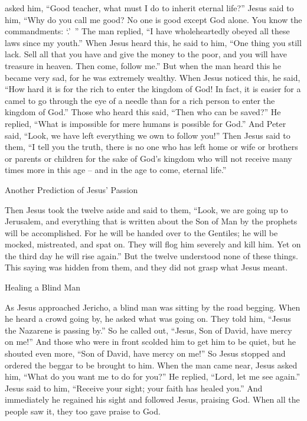 {asked
him,
“Good
teacher,
what
must
I do
to inherit
eternal
life?”
Jesus
said
to him,
“Why
do you call
me
good? No one
is good
except
God
alone.
You know
the commandments: ‘{}.’ ”
The man replied,
“I have wholeheartedly obeyed
all
these
laws since
my youth.”
When
Jesus
heard
this, he said
to him,
“One thing
you
still
lack.
Sell
all
that you have
and
give
the money to the poor,
and
you will have
treasure
in
heaven.
Then
come,
follow
me.”
But
when
the man heard
this
he became
very sad,
for
he was
extremely
wealthy.
When
Jesus
noticed
this,
he said,
“How
hard
it is for the rich
to
enter
the kingdom
of God!
In fact, it is
easier
for
a camel
to go
through
the eye
of a needle
than
for a rich
person to enter
the kingdom
of God.”
Those
who heard
this said,
“Then
who
can
be saved?”
He replied,
“What is impossible
for
mere humans
is
possible
for
God.”
And
Peter
said,
“Look,
we
have left
everything we own
to follow
you!”
Then
Jesus said
to them,
“I tell
you
the truth,
there is
no one
who
has left
home
or
wife
or
brothers
or
parents
or
children
for the sake
of God’s
kingdom
who
will
not
receive
many times more
in
this
age –
and
in
the age
to come,
eternal
life.”
\par }{\SH Another Prediction of Jesus’ Passion
\par }{\PP {}Then
Jesus took
the twelve
aside
and said
to
them,
“Look,
we are going up
to
Jerusalem,
and
everything
that is written
about the Son
of Man
by
the prophets
will be accomplished.
For
he will be handed over
to the Gentiles;
he will be mocked,
mistreated,
and
spat on.
They will flog
him severely
and kill
him.
Yet
on the third
day
he will rise again.”
But
the twelve
understood
none
of these
things. This
saying
was hidden
from
them,
and
they did
not
grasp
what Jesus meant.
\par }{\SH Healing a Blind Man
\par }{\PP {}As Jesus
approached
Jericho,
a blind man
was sitting
by
the road
begging.
When
he heard
a crowd
going by,
he asked
what was going on.
They told
him,
“Jesus
the Nazarene
is passing by.”
So
he called out, “Jesus,
Son
of David,
have mercy
on me!”
And
those who were in front
scolded
him
to get
him
to be quiet,
but
he shouted
even more,
“Son
of David,
have mercy
on me!”
So
Jesus
stopped
and ordered
the beggar
to be brought
to
him.
When the man came near,
Jesus
asked
him,
“What
do
you
want
me to do
for you?” He replied, “Lord,
let me
see again.”
Jesus
said
to him,
“Receive
your sight;
your
faith
has healed
you.”
And
immediately
he regained
his sight
and
followed
Jesus,
praising
God.
When
all
the people
saw
it, they too gave
praise
to God.

}
